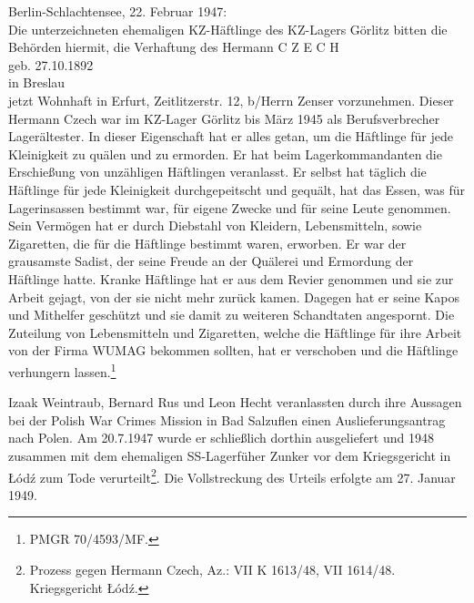 \documentclass[a4paper,12pt,ngerman,
]{nisebook}
\begin{document}
\begin{leftbar}Berlin-Schlachtensee, 22. Februar 1947:\\ 
Die unterzeichneten ehemaligen KZ-Häftlinge des KZ-Lagers Görlitz bitten die Behörden hiermit, die Verhaftung des\newline
Hermann C Z E C H\\
geb. 27.10.1892\\ 
in Breslau\\
jetzt Wohnhaft in Erfurt, Zeitlitzerstr. 12, b/Herrn Zenser vorzunehmen.\newline
Dieser Hermann Czech war im KZ-Lager Görlitz bis März 1945 als Berufsverbrecher Lagerältester. In dieser Eigenschaft hat er alles getan, um die Häftlinge für jede Kleinigkeit zu quälen und zu ermorden. Er hat beim Lagerkommandanten die Erschießung von unzähligen Häftlingen veranlasst. Er selbst hat täglich die Häftlinge für jede Kleinigkeit durchgepeitscht und gequält, hat das Essen, was für Lagerinsassen bestimmt war, für eigene Zwecke und für seine Leute genommen. Sein Vermögen hat er durch Diebstahl von Kleidern, Lebensmitteln, sowie Zigaretten, die für die Häftlinge bestimmt waren, erworben. Er war der grausamste Sadist, der seine Freude an der Quälerei und Ermordung der Häftlinge hatte. Kranke Häftlinge hat er aus dem Revier genommen und sie zur Arbeit gejagt, von der sie nicht mehr zurück kamen. Dagegen hat er seine Kapos und Mithelfer geschützt und sie damit zu weiteren Schandtaten angespornt. Die Zuteilung von Lebensmitteln und Zigaretten, welche die Häftlinge für ihre Arbeit von der Firma WUMAG bekommen sollten, hat er verschoben und die Häftlinge verhungern lassen.\footnote{PMGR 70/4593/MF.}
\end{leftbar}
Izaak Weintraub, Bernard Rus und Leon Hecht veranlassten durch ihre Aussagen bei der Polish War Crimes Mission in Bad Salzuflen einen Auslieferungsantrag nach Polen. Am 20.7.1947 wurde er schließlich dorthin ausgeliefert und 1948 zusammen mit dem ehemaligen SS-Lagerfüher Zunker vor dem Kriegsgericht in \L \'od\'z zum Tode verurteilt\footnote{Prozess gegen Hermann Czech, Az.: VII K 1613/48, VII 1614/48. Kriegsgericht \L \'od\'z.}.
Die Vollstreckung des Urteils erfolgte am 27. Januar 1949.
\end{document}
